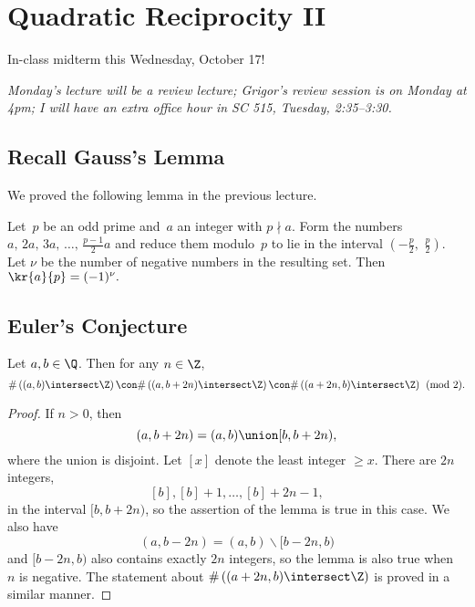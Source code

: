 \documentclass[11pt]{report}
\begin{document}
\chapter{Quadratic Reciprocity II}



\begin{center}
  {\sc\large In-class midterm this Wednesday, October 17!}\vspace{-2ex}
\end{center}
{\sl Monday's lecture will be a review lecture; Grigor's review session is on
Monday at 4pm; I will have an extra office hour in SC 515, Tuesday,
2:35--3:30.}

\section{Recall Gauss's Lemma}
We proved the following lemma in the previous lecture.
\begin{lemma}
  Let~$p$ be an odd prime and~$a$ an integer with $p\nmid a$.
  Form the numbers
  $
    a,\, 2a,\, 3a,\, \ldots,\, \frac{p-1}{2} a
  $
  and reduce them modulo~$p$ to lie in the interval
  $(-\frac{p}{2},\,\, \frac{p}{2})$.
  Let $\nu$ be the number of negative numbers in the resulting set.
  Then
  $
    \kr{a}{p} = (-1)^{\nu}.
  $
\end{lemma}


\section{Euler's Conjecture}
\begin{lemma}\label{lem:even}
  Let $a, b\in\Q$.  Then for any $n\in\Z$,
  $$\#\left((a,b)\intersect \Z\right)
    \con \#\left((a,b+2n)\intersect \Z\right)
    \con \#\left((a+2n,b)\intersect \Z\right)
    \pmod{2}.$$
\end{lemma}
\begin{proof}
  If $n>0$, then
  $$(a,b+2n) = (a,b) \union [b,b+2n),$$
  where the union is disjoint.  Let $[x]$ denote the least integer
  $\geq x$.  There are $2n$ integers,
  $$[b], [b]+1, \ldots, [b]+2n-1,$$
  in the interval $[b,b+2n)$, so
  the assertion of the lemma is true in this case.
  We also have
  $$(a,b-2n) = (a,b)\backslash [b-2n,b)$$
  and $[b-2n,b)$ also contains exactly $2n$ integers,
  so the lemma is also true when~$n$ is negative.
  The statement about $\#\left((a+2n,b)\intersect \Z\right)$
  is proved in a similar manner.
\end{proof}
\end{document}
